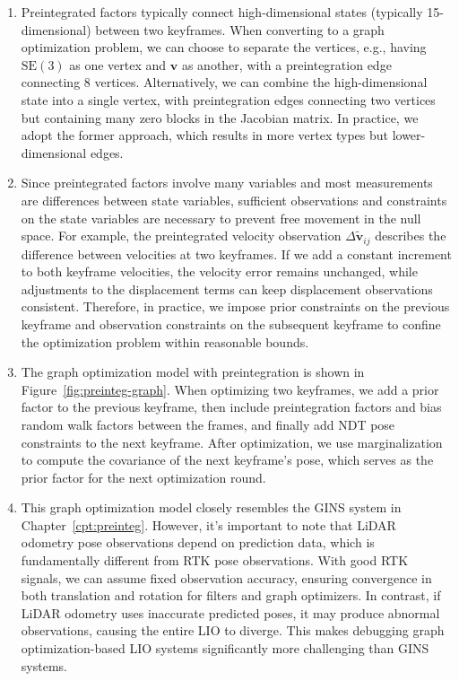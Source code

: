 \begin{enumerate}
	\item Preintegrated factors typically connect high-dimensional states (typically 15-dimensional) between two keyframes. When converting to a graph optimization problem, we can choose to separate the vertices, e.g., having $\mathrm{SE}(3)$ as one vertex and $\bm{v}$ as another, with a preintegration edge connecting 8 vertices. Alternatively, we can combine the high-dimensional state into a single vertex, with preintegration edges connecting two vertices but containing many zero blocks in the Jacobian matrix. In practice, we adopt the former approach, which results in more vertex types but lower-dimensional edges.
	
	\item Since preintegrated factors involve many variables and most measurements are differences between state variables, sufficient observations and constraints on the state variables are necessary to prevent free movement in the null space. For example, the preintegrated velocity observation $\Delta \tilde{\bm{v}}_{ij}$ describes the difference between velocities at two keyframes. If we add a constant increment to both keyframe velocities, the velocity error remains unchanged, while adjustments to the displacement terms can keep displacement observations consistent. Therefore, in practice, we impose prior constraints on the previous keyframe and observation constraints on the subsequent keyframe to confine the optimization problem within reasonable bounds.
	
	\item The graph optimization model with preintegration is shown in Figure~\ref{fig:preinteg-graph}. When optimizing two keyframes, we add a prior factor to the previous keyframe, then include preintegration factors and bias random walk factors between the frames, and finally add NDT pose constraints to the next keyframe. After optimization, we use marginalization to compute the covariance of the next keyframe's pose, which serves as the prior factor for the next optimization round.
	
	\item This graph optimization model closely resembles the GINS system in Chapter~\ref{cpt:preinteg}. However, it's important to note that LiDAR odometry pose observations depend on prediction data, which is fundamentally different from RTK pose observations. With good RTK signals, we can assume fixed observation accuracy, ensuring convergence in both translation and rotation for filters and graph optimizers. In contrast, if LiDAR odometry uses inaccurate predicted poses, it may produce abnormal observations, causing the entire LIO to diverge. This makes debugging graph optimization-based LIO systems significantly more challenging than GINS systems.
	

\end{enumerate}
